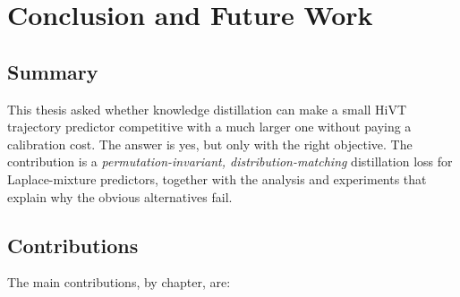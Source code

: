 \chapter{Conclusion and Future Work}
\label{ch:conclusion}

\section{Summary}
\label{sec:concl_summary}
This thesis asked whether knowledge distillation can make a small HiVT trajectory
predictor competitive with a much larger one without paying a calibration cost. The
answer is yes, but only with the right objective. The contribution is a
\emph{permutation-invariant, distribution-matching} distillation loss for
Laplace-mixture predictors, together with the analysis and experiments that explain
why the obvious alternatives fail.


\section{Contributions}
\label{sec:concl_contrib}
The main contributions, by chapter, are:

